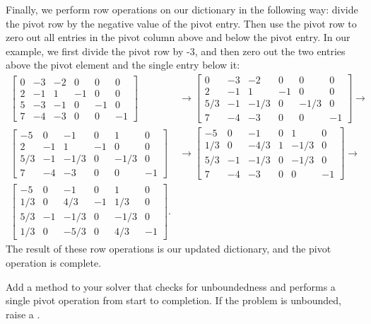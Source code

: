 Finally, we perform row operations on our dictionary in the following way: divide the pivot row by the negative value of the pivot entry.
Then use the pivot row to zero out all entries in the pivot column above and below the pivot entry.
In our example, we first divide the pivot row by -3, and then zero out the two entries above the pivot element and the single entry below it:
\begin{align*}
\begin{bmatrix}
    0 & -3 & -2 & 0 & 0 & 0\\
    2 & -1 & 1 & -1 & 0 & 0\\
    5 & -3 & -1 & 0 & -1 & 0\\
    7 & -4 & -3 & 0 & 0 & -1
    \end{bmatrix} &\rightarrow
\begin{bmatrix}
    0 & -3 & -2 & 0 & 0 & 0\\
    2 & -1 & 1 & -1 & 0 & 0\\
    5/3 & -1 & -1/3 & 0 & -1/3 & 0\\
    7 & -4 & -3 & 0 & 0 & -1
    \end{bmatrix}\rightarrow\\
\begin{bmatrix}
    -5 & 0 & -1 & 0 & 1 & 0\\
    2 & -1 & 1 & -1 & 0 & 0\\
    5/3 & -1 & -1/3 & 0 & -1/3 & 0\\
    7 & -4 & -3 & 0 & 0 & -1
    \end{bmatrix} &\rightarrow
\begin{bmatrix}
    -5 & 0 & -1 & 0 & 1 & 0\\
    1/3 & 0 & -4/3 & 1 & -1/3 & 0\\
    5/3 & -1 & -1/3 & 0 & -1/3 & 0\\
    7 & -4 & -3 & 0 & 0 & -1
    \end{bmatrix}\rightarrow\\
\begin{bmatrix}
    -5 & 0 & -1 & 0 & 1 & 0\\
    1/3 & 0 & 4/3 & -1 & 1/3 & 0\\
    5/3 & -1 & -1/3 & 0 & -1/3 & 0\\
    1/3 & 0 & -5/3 & 0 & 4/3 & -1
    \end{bmatrix}.
\end{align*}
The result of these row operations is our updated dictionary, and the pivot operation is complete.

\begin{problem} %
Add a method to your solver that checks for unboundedness and performs a single pivot operation from start to completion.
If the problem is unbounded, raise a .
\end{problem}


